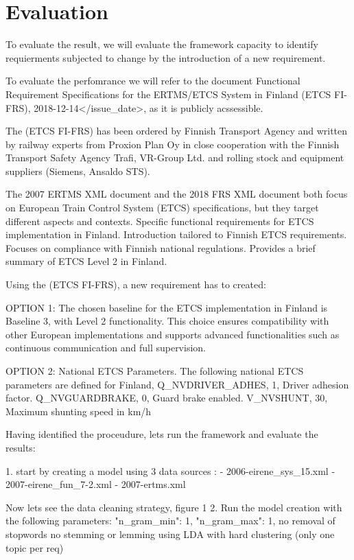 \chapter{Evaluation} \label{chap:chap6}

To evaluate the result, we will evaluate the framework capacity to identify requierments subjected to change by the introduction of a new requirement.

To evaluate the perfomrance we will refer to the document Functional Requirement Specifications for the ERTMS/ETCS System in Finland (ETCS FI-FRS), 2018-12-14</issue_date>, as it is publicly acssessible. 


The (ETCS FI-FRS) has been ordered by Finnish Transport Agency and written by railway experts from Proxion Plan Oy in close cooperation with the Finnish
Transport Safety Agency Trafi, VR-Group Ltd. and rolling stock and equipment suppliers (Siemens, Ansaldo STS).

The 2007 ERTMS XML document and the 2018 FRS XML document both focus on European Train Control System (ETCS) specifications, but they target different aspects and contexts. 
Specific functional requirements for ETCS implementation in Finland.
Introduction tailored to Finnish ETCS requirements.
Focuses on compliance with Finnish national regulations.
Provides a brief summary of ETCS Level 2 in Finland.


Using the (ETCS FI-FRS), a new requirement has to created:

OPTION 1: The chosen baseline for the ETCS implementation in Finland is Baseline 3, with Level 2 functionality. This choice ensures compatibility with other European implementations and supports advanced functionalities such as continuous communication and full supervision.

OPTION 2: National ETCS Parameters. The following national ETCS parameters are defined for Finland, Q_NVDRIVER_ADHES, 1, Driver adhesion factor. Q_NVGUARDBRAKE, 0, Guard brake enabled. V_NVSHUNT, 30, Maximum shunting speed in km/h


Having identified the proceudure, lets run the framework and evaluate the results:

1.
start by creating a model using 3 data sources :
- 2006-eirene_sys_15.xml 
- 2007-eirene_fun_7-2.xml 
- 2007-ertms.xml


Now lets see the data cleaning strategy, figure 1 
2. Run the model creation with the following parameters: 
"n_gram_min": 1,
"n_gram_max": 1,
no removal of stopwords 
no stemming or lemming
using LDA with hard clustering (only one topic per req)

